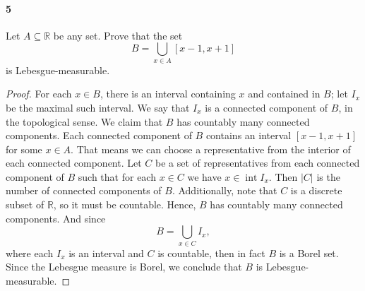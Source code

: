 \documentclass[12pt]{article}
\newlength{\myparskip}
\newenvironment{fullbox}{\begin{lrbox}{\savefullbox}\begin{minipage}{\dimexpr\textwidth-2\fboxsep\relax}\setlength{\parskip}{\myparskip}}{\end{minipage}\end{lrbox}\framebox[\textwidth]{\usebox{\savefullbox}}}
\newenvironment{pbox}[1][]{\begin{fullbox}\ifx#1\empty\else\paragraph{#1}\fi}{\end{fullbox}}
\newcommand{\R}{\mathbb{R}}
\newcommand{\<}{\langle}
\renewcommand{\>}{\rangle}
\begin{document}
\newpage
\begin{pbox}[5]
    Let $A \subseteq \R$ be any set. Prove that the set
    \[
        B = \bigcup_{x \in A} [x - 1, x + 1]
    \]
    is Lebesgue-measurable.
\end{pbox}


\begin{proof}
    For each $x \in B$, there is an interval containing $x$ and contained in $B$; let $I_x$ be the maximal such interval. We say that $I_x$ is a connected component of $B$, in the topological sense. We claim that $B$ has countably many connected components. Each connected component of $B$ contains an interval $[x-1, x+1]$ for some $x \in A$. That means we can choose a representative from the interior of each connected component. Let $C$ be a set of representatives from each connected component of $B$ such that for each $x \in C$ we have $x \in \operatorname{int} I_x$. Then $|C|$ is the number of connected components of $B$. Additionally, note that $C$ is a discrete subset of $\R$, so it must be countable. Hence, $B$ has countably many connected components. And since
    \[
        B = \bigcup_{x \in C} I_x,
    \]
    where each $I_x$ is an interval and $C$ is countable, then in fact $B$ is a Borel set. Since the Lebesgue measure is Borel, we conclude that $B$ is Lebesgue-measurable.

\end{proof}
\end{document}
